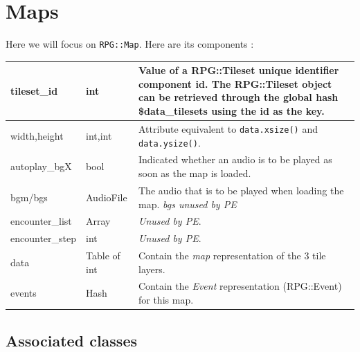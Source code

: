 \documentclass[11pt]{article}
\begin{document}
\newpage
\section{Maps}

Here we will focus on \verb|RPG::Map|. Here are its components :

\begin{tabular}{|a | l | l|}
	\hline
	{\ttfamily tileset\_id} & int & \parbox{.66\linewidth}{\vspace{.2\baselineskip}Value of a {\ttfamily RPG::Tileset} unique identifier component {\ttfamily id}. The {\ttfamily RPG::Tileset} object can be retrieved through the global hash {\ttfamily \$data\_tilesets} using the id as the key.} \\
	\hline
	{\ttfamily width,height} & int,int & Attribute equivalent to \verb|data.xsize()| and \verb|data.ysize()|. \\
	\hline
	{\ttfamily autoplay\_bgX} & bool & Indicated whether an audio is to be played as soon as the map is loaded. \\
	\hline
	{\ttfamily bgm/bgs} & AudioFile & The audio that is to be played when loading the map. \textit{bgs unused by PE} \\
	\hline
	{\ttfamily encounter\_list} & Array & \textit{Unused by PE}. \\
	\hline
	{\ttfamily encounter\_step} & int & \textit{Unused by PE}. \\
	\hline
	{\ttfamily data} & Table of int & Contain the \textit{map} representation of the 3 tile layers. \\
	\hline
	{\ttfamily events} & Hash & Contain the \textit{Event} representation ({\ttfamily RPG::Event}) for this map. \\
	\hline
\end{tabular}


\subsection{Associated classes}
\end{document}
